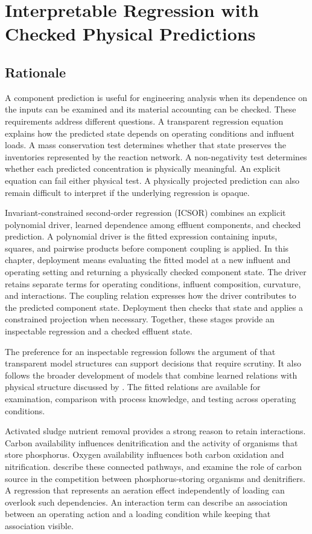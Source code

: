 \chapter{Interpretable Regression with Checked Physical Predictions}
\label{ch:interpretable}

\section{Rationale}

A component prediction is useful for engineering analysis when its dependence on the inputs can be examined and its material accounting can be checked. These requirements address different questions. A transparent regression equation explains how the predicted state depends on operating conditions and influent loads. A mass conservation test determines whether that state preserves the inventories represented by the reaction network. A non-negativity test determines whether each predicted concentration is physically meaningful. An explicit equation can fail either physical test. A physically projected prediction can also remain difficult to interpret if the underlying regression is opaque.

Invariant-constrained second-order regression (ICSOR) combines an explicit polynomial driver, learned dependence among effluent components, and checked prediction. A polynomial driver is the fitted expression containing inputs, squares, and pairwise products before component coupling is applied. In this chapter, deployment means evaluating the fitted model at a new influent and operating setting and returning a physically checked component state. The driver retains separate terms for operating conditions, influent composition, curvature, and interactions. The coupling relation expresses how the driver contributes to the predicted component state. Deployment then checks that state and applies a constrained projection when necessary. Together, these stages provide an inspectable regression and a checked effluent state.

The preference for an inspectable regression follows the argument of \citet{Rudin2019} that transparent model structures can support decisions that require scrutiny. It also follows the broader development of models that combine learned relations with physical structure discussed by \citet{Shen2023}. The fitted relations are available for examination, comparison with process knowledge, and testing across operating conditions.

Activated sludge nutrient removal provides a strong reason to retain interactions. Carbon availability influences denitrification and the activity of organisms that store phosphorus. Oxygen availability influences both carbon oxidation and nitrification. \citet{Wentzel1992} describe these connected pathways, and \citet{Guerrero2011} examine the role of carbon source in the competition between phosphorus-storing organisms and denitrifiers. A regression that represents an aeration effect independently of loading can overlook such dependencies. An interaction term can describe an association between an operating action and a loading condition while keeping that association visible.

